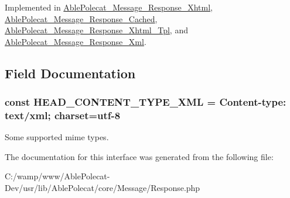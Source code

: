 Implemented in \hyperlink{class_able_polecat___message___response___xhtml_a858ab2a95af7d312509c203de5c6fb11}{Able\+Polecat\+\_\+\+Message\+\_\+\+Response\+\_\+\+Xhtml}, \hyperlink{class_able_polecat___message___response___cached_a858ab2a95af7d312509c203de5c6fb11}{Able\+Polecat\+\_\+\+Message\+\_\+\+Response\+\_\+\+Cached}, \hyperlink{class_able_polecat___message___response___xhtml___tpl_a858ab2a95af7d312509c203de5c6fb11}{Able\+Polecat\+\_\+\+Message\+\_\+\+Response\+\_\+\+Xhtml\+\_\+\+Tpl}, and \hyperlink{class_able_polecat___message___response___xml_a858ab2a95af7d312509c203de5c6fb11}{Able\+Polecat\+\_\+\+Message\+\_\+\+Response\+\_\+\+Xml}.



\subsection{Field Documentation}
\hypertarget{interface_able_polecat___message___response_interface_a91ffe0d292e492f470fd5917d700ce9a}{}
\subsubsection[{H\+E\+A\+D\+\_\+\+C\+O\+N\+T\+E\+N\+T\+\_\+\+T\+Y\+P\+E\+\_\+\+X\+M\+L}]{\setlength{\rightskip}{0pt plus 5cm}const H\+E\+A\+D\+\_\+\+C\+O\+N\+T\+E\+N\+T\+\_\+\+T\+Y\+P\+E\+\_\+\+X\+M\+L = \textquotesingle{}Content-\/type\+: text/xml; charset=utf-\/8\textquotesingle{}}\label{interface_able_polecat___message___response_interface_a91ffe0d292e492f470fd5917d700ce9a}
Some supported mime types. 

The documentation for this interface was generated from the following file\+:\begin{DoxyCompactItemize}
\item 
C\+:/wamp/www/\+Able\+Polecat-\/\+Dev/usr/lib/\+Able\+Polecat/core/\+Message/Response.\+php\end{DoxyCompactItemize}
